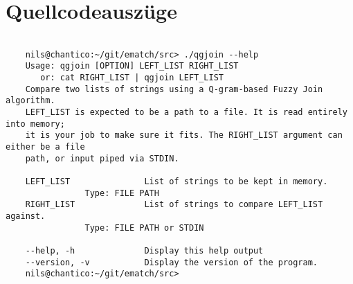 \section{Quellcodeauszüge}







\clearpage




\begin{lstlisting}[style=xterm, caption=Ausgabe der Endnutzerdokumentation über den --help parameter, label=fig:cliHelp,]

	nils@chantico:~/git/ematch/src> ./qgjoin --help
	Usage: qgjoin [OPTION] LEFT_LIST RIGHT_LIST
	   or: cat RIGHT_LIST | qgjoin LEFT_LIST
	Compare two lists of strings using a Q-gram-based Fuzzy Join algorithm.
	LEFT_LIST is expected to be a path to a file. It is read entirely into memory;
	it is your job to make sure it fits. The RIGHT_LIST argument can either be a file
	path, or input piped via STDIN.
	
	LEFT_LIST               List of strings to be kept in memory.
				Type: FILE PATH
	RIGHT_LIST              List of strings to compare LEFT_LIST against.
				Type: FILE PATH or STDIN
	
	--help, -h              Display this help output
	--version, -v           Display the version of the program.
	nils@chantico:~/git/ematch/src>

\end{lstlisting}


